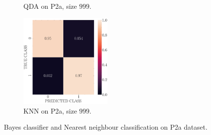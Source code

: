 \documentclass[11pt, a4 paper]{article}
\begin{document}
\begin{figure}[!htbp]
\begin{subfigure}[!htbp]{0.24\textwidth}
       \caption{QDA on P2a, size $999$.}
       \label{fig:QDA_rr20_P2a_999}
    \end{subfigure}
\quad    
    \begin{subfigure}[!htbp]{0.24\textwidth}
       \centering
       \includegraphics[width=1.8in]{../results/ex2/conf_mtx_KNN_dataset_P2a_size_999.pdf}
       \caption{KNN on P2a, size $999$.}
       \label{fig:KNN_rr20_P2a_999}
    \end{subfigure}
\caption{Bayes classifier and Nearest neighbour classification on P2a dataset.}
\label{fig:ex2P2a}
\end{figure}
\end{document}
